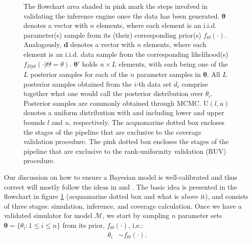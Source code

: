 \documentclass[oneside]{article}
\begin{document}
\begin{figure}
{    The flowchart area shaded in pink mark the steps involved in validating the inference engine once the data has been generated.
    $\boldsymbol{\theta}$ denotes a vector with $n$ elements, where each element is an i.i.d. parameter(s) sample from its (their) corresponding prior(s) $f_\Theta(\cdot)$.
    Analogously, $\boldsymbol{d}$ denotes a vector with $n$ elements, where each element is an i.i.d. data sample from the corresponding likelihood(s) $f_{D|\Theta}(\cdot|\Theta\mathop{=}\theta)$.
    $\boldsymbol{\theta}'$ holds $n \times L$ elements, with each being one of the $L$ posterior samples for each of the $n$ parameter samples in $\boldsymbol{\theta}$.
    All $L$ posterior samples obtained from the $i$-th data set $d_i$ comprise together what one would call the posterior distribution over $\theta_i$.
    Posterior samples are commonly obtained through MCMC.
    $\text{U}(l, u)$ denotes a uniform distribution with and including lower and upper bounds $l$ and $u$, respectively.
    The acquamarine dotted box encloses the stages of the pipeline that are exclusive to the coverage validation procedure.
    The pink dotted box encloses the stages of the pipeline that are exclusive to the rank-uniformity validation (RUV) procedure.}
\label{fig:flowchart}
\vspace{2cm}
\end{figure}

\vspace{.25cm}


Our discussion on how to ensure a Bayesian model is well-calibrated and thus correct will mostly follow the ideas in \citet{cook06} and \citet{Talts2018}.
The basic idea is presented in the flowchart in figure \ref{fig:flowchart} (acquamarine dotted box and what is above it), and consists of three stages: simulation, inference, and coverage calculation.
Once we have a validated simulator for model $\mathcal{M}$, we start by sampling $n$ parameter sets $\boldsymbol{\theta} = \{\theta_i : 1 \leq i \leq n\}$ from its prior,
$f_\Theta(\cdot)$, i.e.:
\begin{align*}
 \theta_i & \sim f_\Theta(\cdot).
\end{align*}
\end{document}
